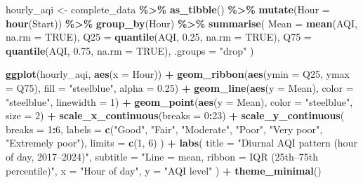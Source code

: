 \documentclass[
]{article}
\newenvironment{Shaded}{\begin{snugshade}}{\end{snugshade}}
\newcommand{\AttributeTok}[1]{\textcolor[rgb]{0.13,0.29,0.53}{#1}}
\newcommand{\ConstantTok}[1]{\textcolor[rgb]{0.56,0.35,0.01}{#1}}
\newcommand{\DecValTok}[1]{\textcolor[rgb]{0.00,0.00,0.81}{#1}}
\newcommand{\FloatTok}[1]{\textcolor[rgb]{0.00,0.00,0.81}{#1}}
\newcommand{\FunctionTok}[1]{\textcolor[rgb]{0.13,0.29,0.53}{\textbf{#1}}}
\newcommand{\NormalTok}[1]{#1}
\newcommand{\OtherTok}[1]{\textcolor[rgb]{0.56,0.35,0.01}{#1}}
\newcommand{\SpecialCharTok}[1]{\textcolor[rgb]{0.81,0.36,0.00}{\textbf{#1}}}
\newcommand{\StringTok}[1]{\textcolor[rgb]{0.31,0.60,0.02}{#1}}
\begin{document}
\begin{Shaded}
\begin{Highlighting}[]
\NormalTok{hourly\_aqi }\OtherTok{\textless{}{-}}\NormalTok{ complete\_data }\SpecialCharTok{\%\textgreater{}\%}
  \FunctionTok{as\_tibble}\NormalTok{() }\SpecialCharTok{\%\textgreater{}\%}
  \FunctionTok{mutate}\NormalTok{(}\AttributeTok{Hour =} \FunctionTok{hour}\NormalTok{(Start)) }\SpecialCharTok{\%\textgreater{}\%}
  \FunctionTok{group\_by}\NormalTok{(Hour) }\SpecialCharTok{\%\textgreater{}\%}
  \FunctionTok{summarise}\NormalTok{(}
    \AttributeTok{Mean  =} \FunctionTok{mean}\NormalTok{(AQI, }\AttributeTok{na.rm =} \ConstantTok{TRUE}\NormalTok{),}
    \AttributeTok{Q25   =} \FunctionTok{quantile}\NormalTok{(AQI, }\FloatTok{0.25}\NormalTok{, }\AttributeTok{na.rm =} \ConstantTok{TRUE}\NormalTok{),}
    \AttributeTok{Q75   =} \FunctionTok{quantile}\NormalTok{(AQI, }\FloatTok{0.75}\NormalTok{, }\AttributeTok{na.rm =} \ConstantTok{TRUE}\NormalTok{),}
    \AttributeTok{.groups =} \StringTok{"drop"}
\NormalTok{  )}

\FunctionTok{ggplot}\NormalTok{(hourly\_aqi, }\FunctionTok{aes}\NormalTok{(}\AttributeTok{x =}\NormalTok{ Hour)) }\SpecialCharTok{+}
  \FunctionTok{geom\_ribbon}\NormalTok{(}\FunctionTok{aes}\NormalTok{(}\AttributeTok{ymin =}\NormalTok{ Q25, }\AttributeTok{ymax =}\NormalTok{ Q75), }\AttributeTok{fill =} \StringTok{"steelblue"}\NormalTok{, }\AttributeTok{alpha =} \FloatTok{0.25}\NormalTok{) }\SpecialCharTok{+}
  \FunctionTok{geom\_line}\NormalTok{(}\FunctionTok{aes}\NormalTok{(}\AttributeTok{y =}\NormalTok{ Mean), }\AttributeTok{color =} \StringTok{"steelblue"}\NormalTok{, }\AttributeTok{linewidth =} \DecValTok{1}\NormalTok{) }\SpecialCharTok{+}
  \FunctionTok{geom\_point}\NormalTok{(}\FunctionTok{aes}\NormalTok{(}\AttributeTok{y =}\NormalTok{ Mean), }\AttributeTok{color =} \StringTok{"steelblue"}\NormalTok{, }\AttributeTok{size =} \DecValTok{2}\NormalTok{) }\SpecialCharTok{+}
  \FunctionTok{scale\_x\_continuous}\NormalTok{(}\AttributeTok{breaks =} \DecValTok{0}\SpecialCharTok{:}\DecValTok{23}\NormalTok{) }\SpecialCharTok{+}
  \FunctionTok{scale\_y\_continuous}\NormalTok{(}
    \AttributeTok{breaks =} \DecValTok{1}\SpecialCharTok{:}\DecValTok{6}\NormalTok{,}
    \AttributeTok{labels =} \FunctionTok{c}\NormalTok{(}\StringTok{"Good"}\NormalTok{, }\StringTok{"Fair"}\NormalTok{, }\StringTok{"Moderate"}\NormalTok{, }\StringTok{"Poor"}\NormalTok{, }\StringTok{"Very poor"}\NormalTok{, }\StringTok{"Extremely poor"}\NormalTok{),}
    \AttributeTok{limits =} \FunctionTok{c}\NormalTok{(}\DecValTok{1}\NormalTok{, }\DecValTok{6}\NormalTok{)}
\NormalTok{  ) }\SpecialCharTok{+}
  \FunctionTok{labs}\NormalTok{(}
    \AttributeTok{title =} \StringTok{"Diurnal AQI pattern (hour of day, 2017–2024)"}\NormalTok{,}
    \AttributeTok{subtitle =} \StringTok{"Line = mean, ribbon = IQR (25th–75th percentile)"}\NormalTok{,}
    \AttributeTok{x =} \StringTok{"Hour of day"}\NormalTok{, }\AttributeTok{y =} \StringTok{"AQI level"}
\NormalTok{  ) }\SpecialCharTok{+}
  \FunctionTok{theme\_minimal}\NormalTok{()}
\end{Highlighting}
\end{Shaded}
\end{document}
